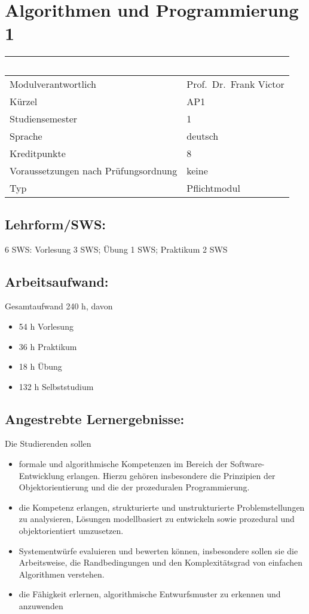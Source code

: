 \chapter{Algorithmen und Programmierung
1}\label{algorithmen-und-programmierung-1}

\begin{longtable}[]{@{}ll@{}}
\toprule
~ & ~\tabularnewline
\midrule
\endhead
Modulverantwortlich & Prof.~Dr.~Frank Victor\tabularnewline
Kürzel & AP1\tabularnewline
Studiensemester & 1\tabularnewline
Sprache & deutsch\tabularnewline
Kreditpunkte & 8\tabularnewline
Voraussetzungen nach Prüfungsordnung & keine\tabularnewline
Typ & Pflichtmodul\tabularnewline
\bottomrule
\end{longtable}

\section*{Lehrform/SWS:}\label{lehrformsws}

6 SWS: Vorlesung 3 SWS; Übung 1 SWS; Praktikum 2 SWS

\section*{Arbeitsaufwand:}\label{arbeitsaufwand}

Gesamtaufwand 240 h, davon

\begin{itemize}
\item
  54 h Vorlesung
\item
  36 h Praktikum
\item
  18 h Übung
\item
  132 h Selbststudium
\end{itemize}

\section*{Angestrebte
Lernergebnisse:}\label{angestrebte-lernergebnisse}

Die Studierenden sollen

\begin{itemize}
\item
  formale und algorithmische Kompetenzen im Bereich der
  Software-Entwicklung erlangen. Hierzu gehören insbesondere die
  Prinzipien der Objektorientierung und die der prozeduralen
  Programmierung.
\item
  die Kompetenz erlangen, strukturierte und unstrukturierte
  Problemstellungen zu analysieren, Lösungen modellbasiert zu entwickeln
  sowie prozedural und objektorientiert umzusetzen.
\item
  Systementwürfe evaluieren und bewerten können, insbesondere sollen sie
  die Arbeitsweise, die Randbedingungen und den Komplexitätsgrad von
  einfachen Algorithmen verstehen.
\item
  die Fähigkeit erlernen, algorithmische Entwurfsmuster zu erkennen und
  anzuwenden
\end{itemize}

